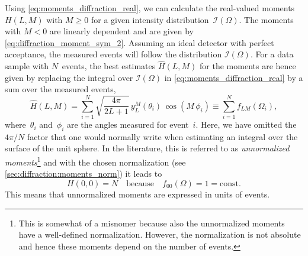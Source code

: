 Using \cref{eq:moments_diffraction_real}, we can calculate the
real-valued moments $H(L, M)$ with $M \geq 0$ for a given intensity
distribution~$\mathcal{I}(\Omega)$.  The moments with $M < 0$ are
linearly dependent and are given by
\cref{eq:diffraction_moment_sym_2}.  Assuming an ideal detector with
perfect acceptance, the measured events will follow the distribution
$\mathcal{I}(\Omega)$.  For a data sample with $N$~events, the best
estimates $\hat{H}(L, M)$ for the moments are hence given by replacing
the integral over $\mathcal{I}(\Omega)$ in
\cref{eq:moments_diffraction_real} by a sum over the measured events,
\ie
\begin{equation}
  \label{eq:moments_diffraction_estimate}
  \hat{H}(L, M)
  = \sum_{i = 1}^N \sqrt{\frac{4 \pi}{2 L + 1}}\, y_L^M(\theta_i)\, \cos(M\, \phi_i)
  \equiv \sum_{i = 1}^N f_{L M}(\Omega_i),
\end{equation}
where~$\theta_i$ and~$\phi_i$ are the angles measured for event~$i$.
Here, we have omitted the $4 \pi / N$ factor that one would normally
write when estimating an integral over the surface of the unit sphere.
In the literature, this is referred to as \emph{unnormalized
moments}\footnote{This is somewhat of a misnomer because also the
unnormalized moments have a well-defined normalization.  However, the
normalization is not absolute and hence these moments depend on the
number of events.} and with the chosen normalization (see
\cref{sec:diffraction:moments_norm}) it leads to
\begin{equation}
  \label{eq:diffraction_weight_00}
  H(0, 0)
  = N
  \quad\text{because}\quad
  f_{00}(\Omega)
  = 1
  = \text{const}.
\end{equation}
This
means that unnormalized moments are expressed in units of events.

